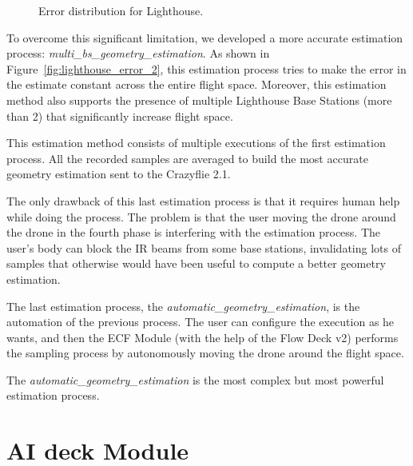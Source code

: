 \begin{figure}[tb]
    \centering
    \qquad
    \caption{Error distribution for Lighthouse.}\label{fig:lighthouse_error}
\end{figure}

To overcome this significant limitation, we developed a more accurate estimation process: \textit{multi\_bs\_geometry\_estimation}. 
As shown in Figure~\ref{fig:lighthouse_error_2}, this estimation process tries to make the error in the estimate constant across the entire flight space. 
Moreover, this estimation method also supports the presence of multiple Lighthouse Base Stations (more than 2) that significantly increase flight space.

This estimation method consists of multiple executions of the first estimation process.
All the recorded samples are averaged to build the most accurate geometry estimation sent to the Crazyflie 2.1.


The only drawback of this last estimation process is that it requires human help while doing the process. 
The problem is that the user moving the drone around the drone in the fourth phase is interfering with the estimation process. 
The user's body can block the IR beams from some base stations, invalidating lots of samples that otherwise would have been useful to compute a better geometry estimation.

The last estimation process, the \textit{automatic\_geometry\_estimation}, is the automation of the previous process. 
The user can configure the execution as he wants, and then the ECF Module (with the help of the Flow Deck v2) performs the sampling process by autonomously moving the drone around the flight space.

The \textit{automatic\_geometry\_estimation} is the most complex but most powerful estimation process.

\section{AI deck Module}\label{sec:module_ai_deck}


